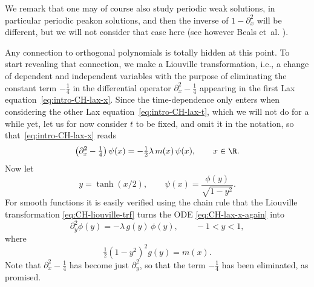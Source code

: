 \documentclass[10pt,a4paper]{article} \pdfoutput=1 
\begin{document}
We remark that one may of course also study periodic weak solutions,
in particular periodic peakon solutions,
and then the inverse of $1-\partial_x^2$ will be different,
but we will not consider that case here
(see however Beals et~al. \cite{beals-sattinger-szmigielski:2002:CF-flows-periodic-peakons-2-peakon-2002, beals-sattinger-szmigielski:2005:CF-flows-periodic-peakons-N-peakon-2005}).

Any connection to orthogonal polynomials is totally hidden at this point.
To start revealing that connection,
we make a Liouville transformation, i.e., a change of dependent and independent variables
with the purpose of eliminating the constant term $-\tfrac14$ in the differential operator
$\partial_x^2 - \tfrac14$
appearing in the first Lax equation~\eqref{eq:intro-CH-lax-x}.
Since the time-dependence only enters when considering
the other Lax equation~\eqref{eq:intro-CH-lax-t},
which we will not do for a while yet,
let us for now consider $t$ to be fixed, and omit it in the notation,
so that~\eqref{eq:intro-CH-lax-x} reads
\begin{equation}
  \label{eq:CH-lax-x-again}
  \bigl( \partial_x^2 - \tfrac14 \bigr) \, \psi(x) = -\tfrac12 \lambda \, m(x) \, \psi(x)
  ,\qquad
  x \in \R
  .
\end{equation}
Now let
\begin{equation}
  \label{eq:CH-liouville-trf}
  y = \tanh(x/2)
  ,\qquad
  \psi(x) = \frac{\phi(y)}{\sqrt{1-y^2}}
  .
\end{equation}
For smooth functions it is easily verified using the chain rule that
the Liouville transformation \eqref{eq:CH-liouville-trf} turns
the ODE \eqref{eq:CH-lax-x-again} into
\begin{equation}
  \label{eq:CH-gstring}
  \partial_y^2 \phi(y) = -\lambda \, g(y) \, \phi(y)
  ,\qquad
  -1 < y < 1
  ,
\end{equation}
where
\begin{equation}
  \label{eq:CH-g-m}
  \tfrac12 (1-y^2)^2 g(y) = m(x)
  .
\end{equation}
Note that $\partial_x^2 - \tfrac14$ has become just $\partial_y^2$,
so that the term $-\frac14$ has been eliminated, as promised.
\end{document}

